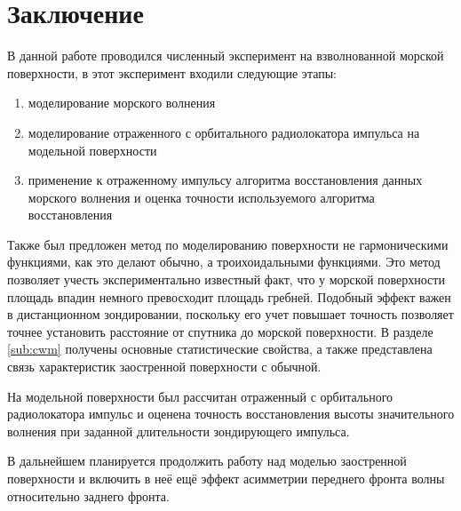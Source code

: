\section{Заключение}%
\label{sec:zakliuchenie}

В данной работе проводился численный эксперимент на взволнованной морской
поверхности, в этот эксперимент входили следующие этапы:
\begin{enumerate}
    \item моделирование морского волнения
    \item моделирование отраженного с орбитального радиолокатора импульса на модельной поверхности
    \item применение к отраженному импульсу алгоритма восстановления данных
    морского волнения и оценка точности используемого алгоритма
    восстановления
\end{enumerate}

Также был предложен метод по моделированию поверхности не гармоническими
функциями, как это делают обычно, а троихоидальными функциями. Это метод
позволяет учесть экспериментально известный факт, что у морской поверхности
площадь впадин немного превосходит площадь гребней. Подобный эффект важен в
дистанционном зондировании, поскольку его учет повышает точность позволяет
точнее установить расстояние от спутника до морской поверхности.  В разделе \ref{sub:cwm} получены основные статистические
свойства, а также представлена связь характеристик заостренной поверхности с
обычной.

На модельной поверхности был рассчитан отраженный с орбитального радиолокатора
импульс и оценена точность восстановления высоты значительного волнения 
при заданной длительности зондирующего импульса. 

В дальнейшем планируется продолжить работу над моделью заостренной поверхности
и включить в неё ещё эффект асимметрии переднего фронта волны относительно
заднего фронта.



